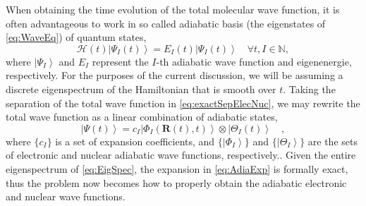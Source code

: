\documentclass[12pt]{article}
\newcommand{\ket}[1]{\left\vert #1 \right\rangle}         %
\newcommand*\vc[1]{\boldsymbol{#1}}
\newcommand*\op[1]{\mathcal{#1}}
\begin{document}
When obtaining the time evolution of the total molecular wave function, it is
often advantageous to work in so called adiabatic basis (the eigenstates of
\cref{eq:WaveEq}) of quantum states,
\begin{equation}
\op{H}(t) \ket{\Psi_I (t)} = E_I(t) \ket{\Psi_I (t)}
\quad \forall t, I \in \mathbb{N},
\label{eq:EigSpec}
\end{equation}
where $\ket{\Psi_I}$ and $E_I$ represent the $I$-th adiabatic wave function and
eigenenergie, respectively. For the purposes of the current discussion, we will
be assuming a discrete eigenspectrum of the Hamiltonian that is smooth over $t$.
Taking the separation of the total wave function in \cref{eq:exactSepElecNuc},
we may rewrite the total wave function as a linear combination of adiabatic
states,
\begin{equation}
\ket{\Psi (t)} = c_I \ket{\Phi_I (\vc{R}(t),t)} \otimes \ket{\Theta_I (t)}
\quad ,
\label{eq:AdiaExp}
\end{equation}
where $\{ c_I \}$ is a set of expansion coefficients, and $\{\ket{\Phi_I}\}$ and
$\{\ket{\Theta_I}\}$ are the sets of electronic and nuclear adiabatic wave
functions, respectively.. Given the entire eigenspectrum of \cref{eq:EigSpec},
the expansion in \cref{eq:AdiaExp} is formally exact, thus the problem now
becomes how to properly obtain the adiabatic electronic and nuclear wave
functions.
\end{document}
